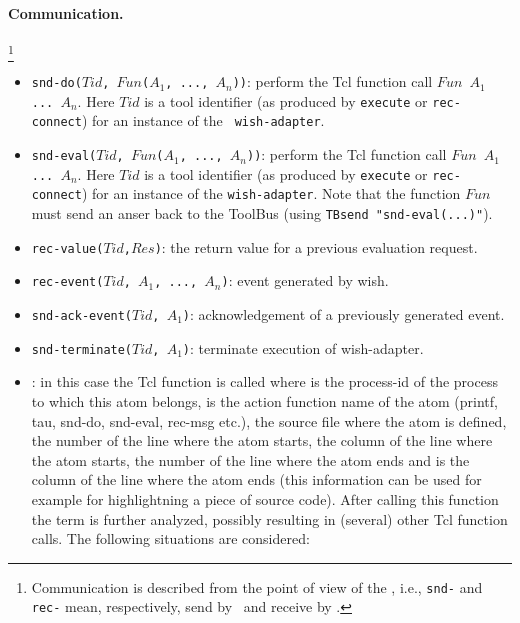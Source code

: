 \paragraph{Communication.} \hspace{-0.3cm}\footnote{Communication is described
from the point of view of the \TB, i.e., {\tt snd-} and {\tt rec-}
mean, respectively, send by \TB\ and receive by \TB.}

\begin{itemize}
\item {\tt snd-do($Tid$, $Fun$($A_1$, ..., $A_n$))}: perform the Tcl function
call
{\tt $Fun$ $A_1$  ... $A_n$}. Here $Tid$ is a tool identifier
(as produced by {\tt execute} or {\tt rec-connect}) for an instance of the {\tt
wish-adapter}.
\item {\tt snd-eval($Tid$, $Fun$($A_1$, ..., $A_n$))}: perform the Tcl function call
{\tt $Fun$ $A_1$  ... $A_n$}. Here $Tid$ is a tool identifier 
(as produced by {\tt execute} or {\tt rec-connect}) for an instance of the {\tt wish-adapter}.
Note that the function {\tt $Fun$} must send an anser back to the
ToolBus (using {\tt TBsend "snd-eval(...)"}).
\item {\tt rec-value($Tid$,$Res$)}: the return value for a previous evaluation request.
\item {\tt rec-event($Tid$, $A_1$, ..., $A_n$)}: event generated by wish.
\item {\tt snd-ack-event($Tid$, $A_1$)}: acknowledgement of
a previously generated event.
\item {\tt snd-terminate($Tid$, $A_1$)}: terminate execution of wish-adapter.
\item {}: in this case the Tcl
  function 
  is called where  is the process-id of the process to
  which this atom belongs,  is the action function name of
  the atom (printf, tau, snd-do, snd-eval, rec-msg etc.),  the
  source file where the atom is defined,  the number of
  the line where the atom starts,  the column of the
  line where the atom starts,  the number of the line
  where the atom ends and  is the column of the line where
  the atom ends (this information can be used for example for
  highlightning a piece of source code). 
  After calling this function the term is further analyzed,
  possibly resulting in (several) other Tcl function
  calls. The following situations are considered:

\end{itemize}
